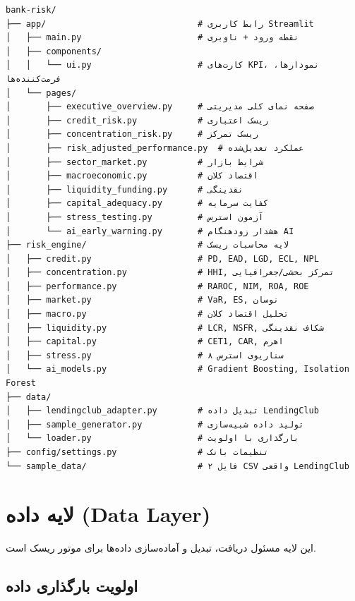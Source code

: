 \documentclass[12pt,a4paper]{article}
\begin{document}
{\small\begin{latin}
\begin{verbatim}
bank-risk/
├── app/                              # رابط کاربری Streamlit
│   ├── main.py                       # نقطه ورود + ناوبری
│   ├── components/
│   │   └── ui.py                     # کارت‌های KPI، نمودارها، فرمت‌کننده‌ها
│   └── pages/
│       ├── executive_overview.py     # صفحه نمای کلی مدیریتی
│       ├── credit_risk.py            # ریسک اعتباری
│       ├── concentration_risk.py     # ریسک تمرکز
│       ├── risk_adjusted_performance.py  # عملکرد تعدیل‌شده
│       ├── sector_market.py          # شرایط بازار
│       ├── macroeconomic.py          # اقتصاد کلان
│       ├── liquidity_funding.py      # نقدینگی
│       ├── capital_adequacy.py       # کفایت سرمایه
│       ├── stress_testing.py         # آزمون استرس
│       └── ai_early_warning.py       # هشدار زودهنگام AI
├── risk_engine/                      # لایه محاسبات ریسک
│   ├── credit.py                     # PD, EAD, LGD, ECL, NPL
│   ├── concentration.py              # HHI, تمرکز بخشی/جغرافیایی
│   ├── performance.py                # RAROC, NIM, ROA, ROE
│   ├── market.py                     # VaR, ES, نوسان
│   ├── macro.py                      # تحلیل اقتصاد کلان
│   ├── liquidity.py                  # LCR, NSFR, شکاف نقدینگی
│   ├── capital.py                    # CET1, CAR, اهرم
│   ├── stress.py                     # ۸ سناریوی استرس
│   └── ai_models.py                  # Gradient Boosting, Isolation Forest
├── data/
│   ├── lendingclub_adapter.py        # تبدیل داده LendingClub
│   ├── sample_generator.py           # تولید داده شبیه‌سازی
│   └── loader.py                     # بارگذاری با اولویت
├── config/settings.py                # تنظیمات بانک
└── sample_data/                      # ۲ فایل CSV واقعی LendingClub
\end{verbatim}
\end{latin}}

\section{لایه داده (Data Layer)}

این لایه مسئول دریافت، تبدیل و آماده‌سازی داده‌ها برای موتور ریسک است.

\subsection{اولویت بارگذاری داده}
\end{document}
